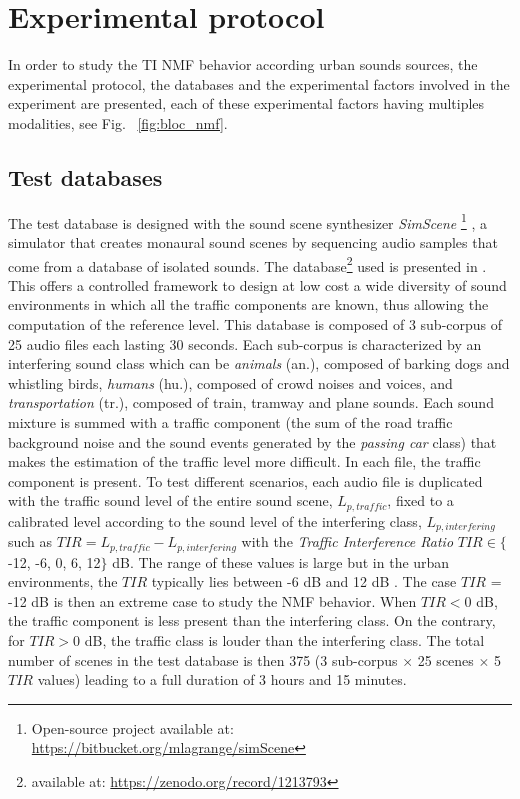 \documentclass[12pt,english,twoside]{article}
\begin{document}
\section{Experimental protocol}\label{part:protocol}

In order to study the TI NMF behavior according urban sounds sources, the experimental protocol, the databases and the experimental factors involved in the experiment are presented, each of these experimental factors having multiples modalities, see Fig.~ \ref{fig:bloc_nmf}.

\subsection{Test databases}\label{part:test_datase}

The test database is designed with the sound scene synthesizer \textit{SimScene} \footnote{Open-source project available at: \url{https://bitbucket.org/mlagrange/simScene}} \cite{rossignol_simscene_2015}, a simulator that creates monaural sound scenes by sequencing audio samples that come from a database of isolated sounds\cite{lagrange2015evaluation}.
The database\footnote{available at: \url{https://zenodo.org/record/1213793}} used is presented in \cite{gloaguen2017creation}. This offers a controlled framework to design at low cost a wide diversity of sound environments in which all the traffic components are known, thus allowing the computation of the reference level.
This database is composed of 3 sub-corpus of 25 audio files each lasting 30 seconds. Each sub-corpus is characterized by an interfering sound class which can be \textit{animals} (an.), composed of barking dogs and whistling birds, \textit{humans} (hu.), composed of crowd noises and voices, and \textit{transportation} (tr.), composed of train, tramway and plane sounds. Each sound mixture is summed  with a traffic component (the sum of the road traffic background noise and the sound events generated by the \textit{passing car} class) that makes the estimation of the traffic level more difficult. In each file, the traffic component is present. To test different scenarios, each audio file is duplicated with the traffic sound level of the entire sound scene, $L_{p,traffic}$, fixed to a calibrated level according to the sound level of the interfering class, $L_{p,interfering}$ such as $
TIR = L_{p,traffic}-L_{p,interfering}$ with the \textit{Traffic Interference Ratio} $TIR \in \lbrace$-12, -6, 0, 6, 12$\rbrace$ dB.
The range of these values is large but in the urban environments, the $TIR$ typically lies between -6 dB and 12 dB \cite{gloaguen2017creation}. The case $TIR$ = -12 dB is then an extreme case to study the NMF behavior. When $TIR < 0$ dB, the traffic component is less present than the interfering class. On the contrary, for $TIR > 0$ dB, the traffic class is louder than the interfering class. The total number of scenes in the test database is then 375 (3 sub-corpus $\times$ 25 scenes $\times$  5 $TIR$ values) leading to a full duration of 3 hours and 15 minutes.
\end{document}
